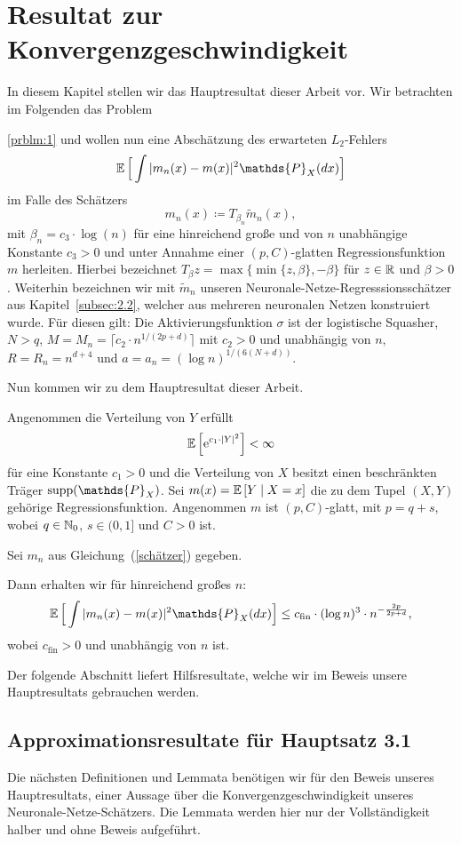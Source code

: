 \chapter{Resultat zur Konvergenzgeschwindigkeit}
\label{chap:3}

In diesem Kapitel stellen wir das Hauptresultat dieser Arbeit vor.
Wir betrachten im Folgenden das Problem~{\ref{prblm:1} und wollen nun eine Abschätzung des erwarteten $L_2$-Fehlers 
$$\E \Big[\int |m_n(x) - m(x)|^2  \mathds{P}_X(dx)\Big]$$
im Falle des Schätzers 
\begin{equation}
\label{schätzer}
m_n(x) \coloneqq T_{\beta_n}\tilde{m}_n (x),
\end{equation}
mit $\beta_n = c_3 \cdot \log(n)$ für eine hinreichend große und von $n$ unabhängige Konstante $c_3 > 0$ und unter Annahme einer $(p,C)$-glatten Regressionsfunktion $m$ herleiten. Hierbei bezeichnet $T_{\beta}z = \max\{\min\{z, \beta\}, -\beta\}$
für $z \in \mathbb{R}$ und $\beta > 0$. Weiterhin bezeichnen wir mit $\tilde{m}_n$ unseren Neuronale-Netze-Regresssionsschätzer aus Kapitel~\ref{subsec:2.2}, welcher aus mehreren neuronalen Netzen konstruiert wurde. Für diesen gilt: 
Die Aktivierungsfunktion $\sigma$ ist der logistische Squasher, $N > q$, $M = M_n = \lceil c_2 \cdot n^{1/(2p + d)}\rceil$ mit $c_2 >0$ und unabhängig von $n$, $R = R_n = n^{d + 4}$ und $a = a_n = (\log n)^{1/(6(N + d))}.$

Nun kommen wir zu dem Hauptresultat dieser Arbeit.
\begin{mthm}
\label{optstop}
Angenommen die Verteilung von $Y$ erfüllt 
$$ \mathbb{E}\,\Big[\mathrm{e}^{c_1 \cdot |Y|^2}\Big] < \infty$$
für eine Konstante $c_1 > 0$ und die Verteilung von $X$ besitzt einen beschränkten Träger $\supp(\mathds{P}_X)$. Sei $m(x) = \mathbb{E}\,[Y \mid X = x]$ die zu dem Tupel $(X, Y)$ gehörige Regressionsfunktion.
Angenommen $m$ ist $(p,C)$-glatt, mit $p = q + s$, wobei $q \in \mathbb{N}_0$, $s \in (0,1]$ und $C > 0$ ist.

Sei $m_n$ aus Gleichung~(\ref{schätzer}) gegeben.

Dann erhalten wir für hinreichend großes $n$:
$$\E \Big[\int |m_n(x) - m(x)|^2  \mathds{P}_X(dx)\Big] \leq c_{\mathrm{fin}} \cdot (\log n)^3 \cdot n^{- \frac{2p}{2p + d}},$$
wobei $c_{\mathrm{fin}} > 0$ und unabhängig von $n$ ist.
\end{mthm}

Der folgende Abschnitt liefert Hilfsresultate, welche wir im Beweis unsere Hauptresultats gebrauchen werden.

\section{Approximationsresultate für Hauptsatz 3.1}
Die nächsten  Definitionen und Lemmata benötigen wir für den Beweis unseres Hauptresultats, einer Aussage über die Konvergenzgeschwindigkeit unseres Neuronale-Netze-Schätzers. Die Lemmata werden hier nur der Vollständigkeit halber und ohne Beweis aufgeführt. 

}
